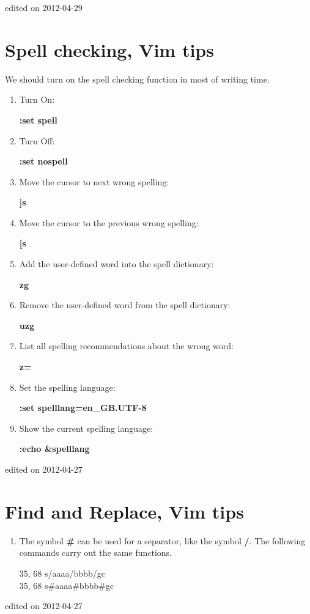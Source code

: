\hfill {\tiny edited on 2012-04-29}

\section{Spell checking, Vim tips}
We should turn on the spell checking function in most of writing time.
\begin{enumerate}
\item Turn On:  \begin{center}\bf :set spell \end{center}
\item Turn Off:  \begin{center}\bf :set nospell \end{center}
\item Move the cursor to next wrong spelling:  \begin{center}\bf ]s \end{center}
\item Move the cursor to the previous wrong spelling:  \begin{center}\bf [s \end{center}
\item Add the user-defined word into the spell dictionary:  \begin{center}\bf zg \end{center}
\item Remove the user-defined word from the spell dictionary:  \begin{center}\bf uzg \end{center}
\item List all spelling recommendations about the wrong word:  \begin{center}\bf z= \end{center}
\item Set the spelling language:  \begin{center}\bf :set spelllang=en\_GB.UTF-8 \end{center}
\item Show the current spelling language:  \begin{center}\bf :echo \&spelllang  \end{center}
\end{enumerate}
\hfill {\tiny edited on 2012-04-27}

\section{Find and Replace, Vim tips}
\begin{enumerate}
\item The symbol {\bf \#} can be used for a separator, like the symbol {\bf /}. The following commands carry out the same functions.  
\begin{center}
35, 68 s/aaaa/bbbb/gc \\
35, 68 s\#aaaa\#bbbb\#gc
\end {center}
\end{enumerate}
\hfill {\tiny edited on 2012-04-27}

